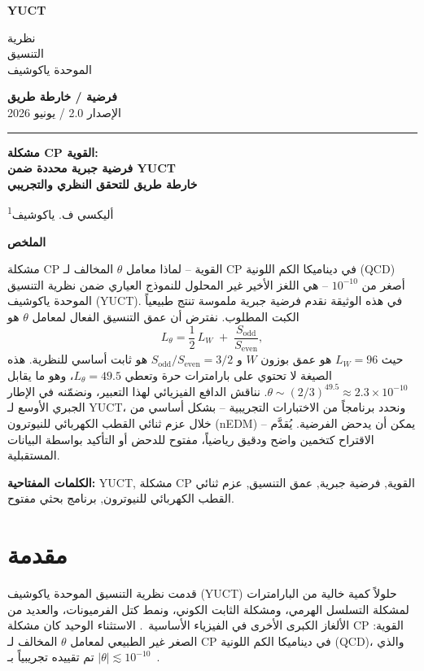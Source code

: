 \documentclass[12pt,a4paper]{article}
\newcommand{\makeheader}{%
	\noindent
	\begin{minipage}{0.17\textwidth}
		\raggedright
		{\sffamily\bfseries\color{skyblue}\fontsize{46}{46}\selectfont YUCT}%
	\end{minipage}%
	\hspace{30pt}
	\begin{minipage}{0.32\textwidth}
		\raggedright
		{\sffamily\fontsize{11}{13}\selectfont نظرية\\ التنسيق\\ الموحدة ياكوشيف}%
	\end{minipage}%
	\hfill
	\begin{minipage}{0.38\textwidth}
		\raggedleft
		{\sffamily\bfseries فرضية / خارطة طريق}\\ 
		{\sffamily الإصدار 2.0 / يونيو 2026}\\ 
	\end{minipage}
	\par\vspace{5pt}
	\noindent\textcolor{gold}{\rule{\textwidth}{1.6pt}}
	\par\vspace{0pt}
}
\begin{document}
	\thispagestyle{firstpage}
	\makeheader
	
	\vspace{0cm}
	{\LARGE\bfseries مشكلة CP القوية:\\[0.1cm] فرضية جبرية محددة ضمن YUCT\\[0.2cm] \Large خارطة طريق للتحقق النظري والتجريبي \par}
	\vspace{0.2cm}
	
	{\large أليكسي ف. ياكوشيف\textsuperscript{1}} \\
	\vspace{0.0cm}
	
	{\color{darkblue}\textbf{\LARGE الملخص}} \par
	{\large
		\noindent
		مشكلة CP القوية – لماذا معامل \(\theta\) المخالف لـ CP في ديناميكا الكم اللونية (QCD) أصغر من \(10^{-10}\) – هي اللغز الأخير غير المحلول للنموذج العياري ضمن نظرية التنسيق الموحدة ياكوشيف (YUCT). في هذه الوثيقة نقدم فرضية جبرية ملموسة تنتج طبيعياً الكبت المطلوب. نفترض أن عمق التنسيق الفعال لمعامل \(\theta\) هو
		\[
		L_\theta = \frac{1}{2}\,L_W \;+\; \frac{S_{\mathrm{odd}}}{S_{\mathrm{even}}},
		\]
		حيث \(L_W = 96\) هو عمق بوزون \(W\) و \(S_{\mathrm{odd}}/S_{\mathrm{even}} = 3/2\) هو ثابت أساسي للنظرية. هذه الصيغة لا تحتوي على بارامترات حرة وتعطي \(L_\theta = 49.5\)، وهو ما يقابل \(\theta \sim (2/3)^{49.5} \approx 2.3 \times 10^{-10}\). نناقش الدافع الفيزيائي لهذا التعبير، ونضمّنه في الإطار الجبري الأوسع لـ YUCT، ونحدد برنامجاً من الاختبارات التجريبية – بشكل أساسي من خلال عزم ثنائي القطب الكهربائي للنيوترون (nEDM) – يمكن أن يدحض الفرضية. يُقدَّم الاقتراح كتخمين واضح ودقيق رياضياً، مفتوح للدحض أو التأكيد بواسطة البيانات المستقبلية.
	}
	
	\vspace{0.1cm}
	\noindent
	{\color{darkblue}\textbf{الكلمات المفتاحية:}} YUCT, مشكلة CP القوية, فرضية جبرية, عمق التنسيق, عزم ثنائي القطب الكهربائي للنيوترون, برنامج بحثي مفتوح.
	\vspace{0.4cm}
	
	\clearpage
	\tableofcontents
	\newpage
	
	\section{مقدمة}
	\label{sec:intro}
	
	قدمت نظرية التنسيق الموحدة ياكوشيف (YUCT) حلولاً كمية خالية من البارامترات لمشكلة التسلسل الهرمي، ومشكلة الثابت الكوني، ونمط كتل الفرميونات، والعديد من الألغاز الكبرى الأخرى في الفيزياء الأساسية~\cite{Y1,Y3,Y4}. الاستثناء الوحيد كان مشكلة CP القوية: الصغر غير الطبيعي لمعامل \(\theta\) المخالف لـ CP في ديناميكا الكم اللونية (QCD)، والذي تم تقييده تجريبياً بـ \(|\theta| \lesssim 10^{-10}\)~\cite{nEDM2020}.
	
\end{document}
